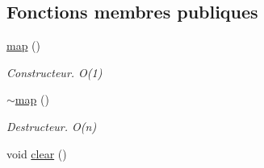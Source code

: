 \subsection*{Fonctions membres publiques}
\begin{DoxyCompactItemize}
\item 
\hypertarget{classmap_a580b1dfaaf03c987d635c2aede009e83}{\hyperlink{classmap_a580b1dfaaf03c987d635c2aede009e83}{map} ()}\label{classmap_a580b1dfaaf03c987d635c2aede009e83}

\begin{DoxyCompactList}\small\item\em Constructeur. O(1) \end{DoxyCompactList}\item 
\hypertarget{classmap_a66666e683d5ffbaacaa5b0b4c0faa4dd}{\hyperlink{classmap_a66666e683d5ffbaacaa5b0b4c0faa4dd}{$\sim$map} ()}\label{classmap_a66666e683d5ffbaacaa5b0b4c0faa4dd}

\begin{DoxyCompactList}\small\item\em Destructeur. O(n) \end{DoxyCompactList}\item 
\hypertarget{classmap_a5d1a8dc2e13afc404082badea9a99f8b}{void \hyperlink{classmap_a5d1a8dc2e13afc404082badea9a99f8b}{clear} ()}\label{classmap_a5d1a8dc2e13afc404082badea9a99f8b}


\end{DoxyCompactItemize}
